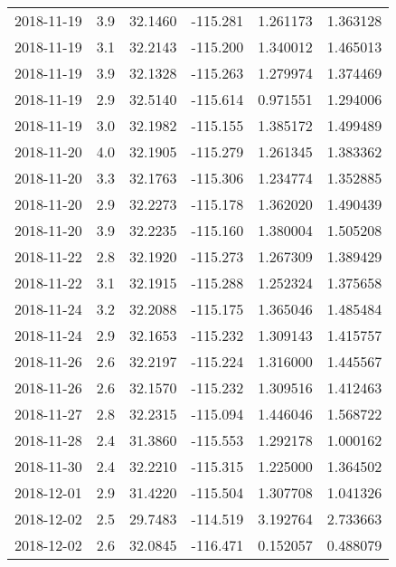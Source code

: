 \begin{tabular}{lrrrrr}
2018-11-19 &       3.9 &  32.1460 &  -115.281 &         1.261173 &         1.363128 \\
2018-11-19 &       3.1 &  32.2143 &  -115.200 &         1.340012 &         1.465013 \\
2018-11-19 &       3.9 &  32.1328 &  -115.263 &         1.279974 &         1.374469 \\
2018-11-19 &       2.9 &  32.5140 &  -115.614 &         0.971551 &         1.294006 \\
2018-11-19 &       3.0 &  32.1982 &  -115.155 &         1.385172 &         1.499489 \\
2018-11-20 &       4.0 &  32.1905 &  -115.279 &         1.261345 &         1.383362 \\
2018-11-20 &       3.3 &  32.1763 &  -115.306 &         1.234774 &         1.352885 \\
2018-11-20 &       2.9 &  32.2273 &  -115.178 &         1.362020 &         1.490439 \\
2018-11-20 &       3.9 &  32.2235 &  -115.160 &         1.380004 &         1.505208 \\
2018-11-22 &       2.8 &  32.1920 &  -115.273 &         1.267309 &         1.389429 \\
2018-11-22 &       3.1 &  32.1915 &  -115.288 &         1.252324 &         1.375658 \\
2018-11-24 &       3.2 &  32.2088 &  -115.175 &         1.365046 &         1.485484 \\
2018-11-24 &       2.9 &  32.1653 &  -115.232 &         1.309143 &         1.415757 \\
2018-11-26 &       2.6 &  32.2197 &  -115.224 &         1.316000 &         1.445567 \\
2018-11-26 &       2.6 &  32.1570 &  -115.232 &         1.309516 &         1.412463 \\
2018-11-27 &       2.8 &  32.2315 &  -115.094 &         1.446046 &         1.568722 \\
2018-11-28 &       2.4 &  31.3860 &  -115.553 &         1.292178 &         1.000162 \\
2018-11-30 &       2.4 &  32.2210 &  -115.315 &         1.225000 &         1.364502 \\
2018-12-01 &       2.9 &  31.4220 &  -115.504 &         1.307708 &         1.041326 \\
2018-12-02 &       2.5 &  29.7483 &  -114.519 &         3.192764 &         2.733663 \\
2018-12-02 &       2.6 &  32.0845 &  -116.471 &         0.152057 &         0.488079 \\

\end{tabular}
